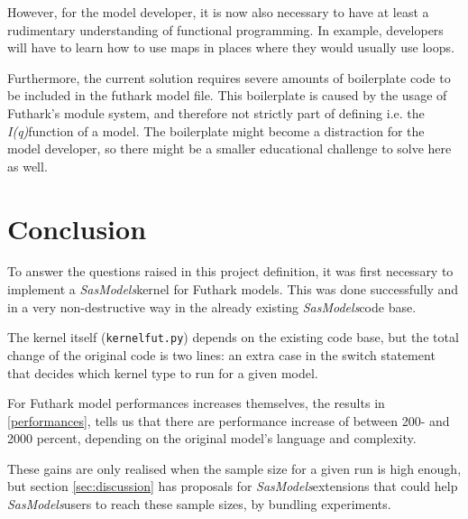 \documentclass[11pt]{article}
\newcommand{\sasmodels}{\textit{SasModels}}
\newcommand{\iq}{\textit{I(q)}}
\begin{document}
\begin{mdframed}[
    frametitle={Why does Futhark perform faster than OpenCL?},
    nobreak=true]
However, for the model developer, it is now also necessary to have at least a
rudimentary understanding of functional programming.
In example, developers will have to learn how to use maps in
places where they would usually use loops.

Furthermore, the current solution requires severe amounts of boilerplate code to
be included in the futhark model file.
This boilerplate is caused by the usage of Futhark's module system, and
therefore not strictly part of defining i.e. the \iq function of a model.
The boilerplate might become a distraction for the model developer, so
there might be a smaller educational challenge to solve here as well.

\section{Conclusion}
To answer the questions raised in this project definition, it was first
necessary to implement a \sasmodels kernel for Futhark models. This was done
successfully and in a very non-destructive way in the already existing
\sasmodels code base.

The kernel itself (\texttt{kernelfut.py}) depends on the existing code base, but
the total change of the original code is two lines: an extra case in the
switch statement that decides which kernel type to run for a given model.

For Futhark model performances increases themselves, the results in
\ref{performances}, tells us that there are performance increase of between
200- and 2000 percent, depending on the original model's language and
complexity.

These gains are only realised when the sample size for a given run is high
enough, but section \ref{sec:discussion} has proposals for \sasmodels extensions
that could help \sasmodels users to reach these sample sizes, by bundling
experiments.


\end{mdframed}
\end{document}
